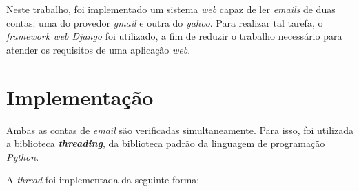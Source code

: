 \documentclass[10pt]{article}
\begin{document}
\MakeScribeTop

Neste trabalho, foi implementado um sistema \textit{web} capaz de ler \textit{emails} de duas contas: uma do provedor \textit{gmail} e outra do \textit{yahoo}. 
Para realizar tal tarefa, o \textit{framework web Django} foi utilizado, a fim de reduzir o trabalho necessário para atender os requisitos de uma aplicação \textit{web}.\\

\section{Implementação}
Ambas as contas de \textit{email} são verificadas simultaneamente. Para isso, foi utilizada a biblioteca \textit{\textbf{threading}}, da biblioteca padrão da linguagem de programação \textit{Python}.

A \textit{thread} foi implementada da seguinte forma:
\end{document}
